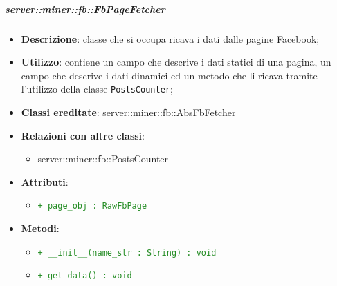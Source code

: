 		\subparagraph{server::miner::fb::FbPageFetcher} %
		\label{subp:server_miner_fb_FbPageFetcher}
			\begin{itemize}
				\item \textbf{Descrizione}: classe che si occupa ricava i dati dalle pagine Facebook;
				\item \textbf{Utilizzo}: contiene un campo che descrive i dati statici di una pagina, un campo che descrive i dati dinamici ed un metodo che li ricava tramite l'utilizzo della classe \texttt{PostsCounter};
				\item \textbf{Classi ereditate}: server::miner::fb::AbsFbFetcher
				\item \textbf{Relazioni con altre classi}:
					\begin{itemize}
						\item server::miner::fb::PostsCounter
					\end{itemize}
				\item \textbf{Attributi}: 
					\begin{itemize}
						\item \textcolor{forestgreen}{\texttt{+ page\_obj : RawFbPage}}
					\end{itemize}
				\item \textbf{Metodi}:   
					\begin{itemize}
						\item \textcolor{forestgreen}{\texttt{+ \_\_init\_\_(name\_str : String) : void}}
						\item \textcolor{forestgreen}{\texttt{+ get\_data() : void}}

\end{itemize}
\end{itemize}

